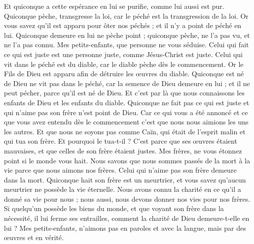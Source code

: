 \begin{multicols}{2}
Et quiconque a cette espérance en lui se purifie, comme lui aussi est pur.
Quiconque pèche, transgresse la loi, car le péché est la transgression de la loi.
Or vous savez qu'il est apparu pour ôter nos péchés ; et il n'y a point de péché en lui.
Quiconque demeure en lui ne pèche point ; quiconque pèche, ne l'a pas vu, et ne l'a pas connu.
Mes petits-enfants, que personne ne vous séduise. Celui qui fait ce qui est juste est une personne juste, comme Jésus-Christ est juste.
Celui qui vit dans le péché est du diable, car le diable pèche dès le commencement. Or le Fils de Dieu est apparu afin de détruire les œuvres du diable.
Quiconque est né de Dieu ne vit pas dans le péché, car la semence de Dieu demeure en lui ; et il ne peut pécher, parce qu'il est né de Dieu.
Et c'est par là que nous connaissons les enfants de Dieu et les enfants du diable. Quiconque ne fait pas ce qui est juste et qui n'aime pas son frère n'est point de Dieu.
Car ce qui vous a été annoncé et ce que vous avez entendu dès le commencement c'est que nous nous aimions les uns les autres.
Et que nous ne soyons pas comme Caïn, qui était de l'esprit malin et qui tua son frère. Et pourquoi le tua-t-il ? C'est parce que ses œuvres étaient mauvaises, et que celles de son frère étaient justes.
Mes frères, ne vous étonnez point si le monde vous hait.
Nous savons que nous sommes passés de la mort à la vie parce que nous aimons nos frères. Celui qui n'aime pas son frère demeure dans la mort.
Quiconque hait son frère est un meurtrier, et vous savez qu'aucun meurtrier ne possède la vie éternelle.
Nous avons connu la charité en ce qu'il a donné sa vie pour nous ; nous aussi, nous devons donner nos vies pour nos frères.
Si quelqu'un possède les biens du monde, et que voyant son frère dans la nécessité, il lui ferme ses entrailles, comment la charité de Dieu demeure-t-elle en lui ?
Mes petits-enfants, n'aimons pas en paroles et avec la langue, mais par des œuvres et en vérité.

\end{multicols}
